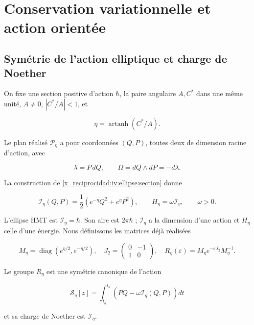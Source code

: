 \chapter{Conservation variationnelle et action orientée}
\label{x_reciprocidad:nuclear:7}
\section{Symétrie de l’action elliptique et charge de Noether}

On fixe une section positive d’action \(\hbar\), la paire angulaire \(A,C^*\) dans une même unité, \(A\ne0\), \(|C^*/A|<1\), et

\[
\eta=\operatorname{artanh}(C^*/A).
\]

Le plan réalisé \(\mathcal P_\eta\) a pour coordonnées \((Q,P)\), toutes deux de dimension racine d’action, avec

\[
\lambda=P\,dQ,\qquad \Omega=dQ\wedge dP=-d\lambda.
\]

La construction de \cref{x_reciprocidad:iv:ellipse:section} donne

\begin{equation}
\mathcal I_\eta(Q,P)=\frac12(e^{-\eta}Q^2+e^\eta P^2),
\qquad H_\eta=\omega\mathcal I_\eta,\qquad \omega>0.
\label{x_reciprocidad:nuc07:eq:1}
\end{equation}

L’ellipse HMT est \(\mathcal I_\eta=\hbar\). Son aire est \(2\pi\hbar\) ; \(\mathcal I_\eta\) a la dimension d’une action et \(H_\eta\) celle d’une énergie. Nous définissons les matrices déjà réalisées

\begin{equation}
M_\eta=\operatorname{diag}(e^{\eta/2},e^{-\eta/2}),\quad
J_2=\begin{pmatrix}0&-1\\1&0\end{pmatrix},\quad
R_\eta(\varepsilon)=M_\eta e^{-\varepsilon J_2}M_\eta^{-1}.
\label{x_reciprocidad:nuc07:eq:2}
\end{equation}

\begin{proposition}
Le groupe \(R_\eta\) est une symétrie canonique de l’action

\begin{equation}
\mathscr S_\eta[z]=\int_{t_a}^{t_b}
\left(P\dot Q-\omega\mathcal I_\eta(Q,P)\right)dt
\label{x_reciprocidad:nuc07:eq:3}
\end{equation}

et sa charge de Noether est \(\mathcal I_\eta\).
\end{proposition}


